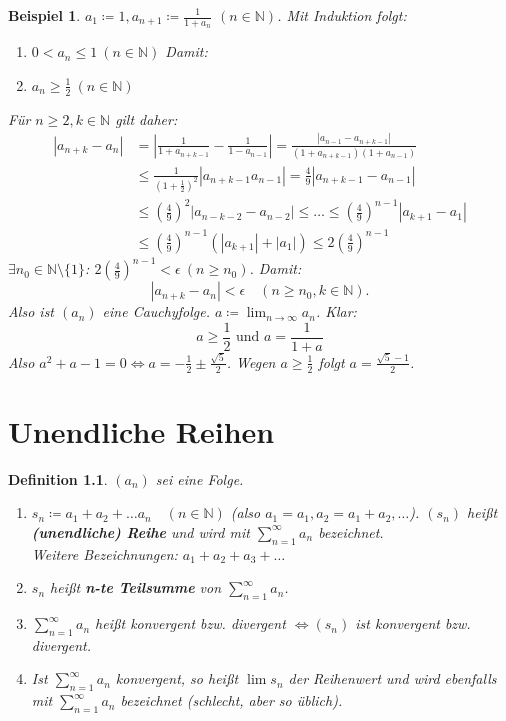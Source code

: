\documentclass{extreport}
\newcommand{\N}{\mathbb{N}}
\theoremstyle{named}
\theoremstyle{dotless}
\newtheorem*{beispiel*}{Beispiel}
\newtheorem*{definition}{Definition}
\begin{document}
\begin{beispiel*}
	$a_{1} \coloneqq 1, a_{n+1} \coloneqq \frac{1}{1 + a_{n}}$ $(n \in \N)$. Mit Induktion folgt:
	\begin{enumerate}
		\item[1)] $0 < a_{n} \leq 1 ~(n \in \N)$ Damit:
		\item[2)] $a_{n} \geq \frac{1}{2} ~(n \in \N)$
	\end{enumerate}
	Für $n \geq 2, k \in \N$ gilt daher:
	\begin{align*}
		|a_{n+k} - a_{n} | & = \left| \frac{1}{1+a_{n+k-1}} - \frac{1}{1 - a_{n - 1}} \right| = \frac{|a_{n-1} - a_{n +k-1}|}{(1+a_{n+k-1})(1+a_{n-1})} \\
			& \leq \frac{1}{(1+\frac{1}{2})^{2}} |a_{n+k-1} a_{n-1}| = \frac{4}{9} |a_{n+k-1} - a_{n-1}| \\
			& \leq \left(\frac{4}{9} \right)^{2} |a_{n-k-2} - a_{n-2}| \leq \dotsc \leq \left( \frac{4}{9} \right)^{n-1} |a_{k+1} - a_{1}| \\
			& \leq \left( \frac{4}{9} \right)^{n-1} \left( |a_{k+1}| + |a_{1}|\right) \leq 2 \left( \frac{4}{9} \right)^{n-1} 
	\end{align*}
	$\exists n_{0} \in \N \setminus \{ 1 \}$: $2\left(\frac{4}{9}\right)^{n-1} < \epsilon ~(n \geq n_{0})$. Damit: 
		$$ |a_{n+k} - a_{n}| < \epsilon \quad (n \geq n_{0}, k \in \N). $$
	Also ist $(a_{n})$ eine Cauchyfolge. $a \coloneqq \lim_{n \rightarrow \infty} a_{n}$. Klar: 
	$$ a \geq \frac{1}{2} \text{ und } a = \frac{1}{1 + a} $$
	Also $a^{2} + a - 1 = 0 \iff a = - \frac{1}{2} \pm \frac{\sqrt{5}}{2}$. Wegen $a \geq \frac{1}{2}$ folgt $a = \frac{\sqrt{5} - 1}{2}$.
\end{beispiel*}


\newpage


\chapter{Unendliche Reihen}


     
\begin{definition} $(a_{n})$ sei eine Folge.
	\begin{enumerate}
		\item $ s_{n} \coloneqq a_{1} + a_{2} + \dotsc a_{n} \quad (n \in \N)$
		(also $a_{1} = a_{1}, a_{2} = a_{1} + a_{2}, \dotsc$). $(s_{n})$ hei{\ss}t \textbf{(unendliche) Reihe} und wird mit $\sum_{n = 1}^{\infty} a_{n}$ bezeichnet. \\
		Weitere Bezeichnungen: $a_{1} + a_{2} + a_{3} + \dotsc$
		\item $s_{n}$ hei{\ss}t \textbf{n-te Teilsumme} von $\sum_{n=1}^{\infty} a_{n}$.	
		\item $\sum_{n=1}^{\infty} a_{n}$ hei{\ss}t konvergent bzw. divergent $\iff (s_{n})$ ist konvergent 	bzw. divergent.
		\item Ist $\sum_{n = 1}^{\infty} a_{n}$ konvergent, so hei{\ss}t $\lim s_{n}$ der Reihenwert und wird ebenfalls mit $\sum_{n=1}^{\infty} a_{n}$ bezeichnet (schlecht, aber so üblich).
	\end{enumerate} 	
\end{definition}
\end{document}
